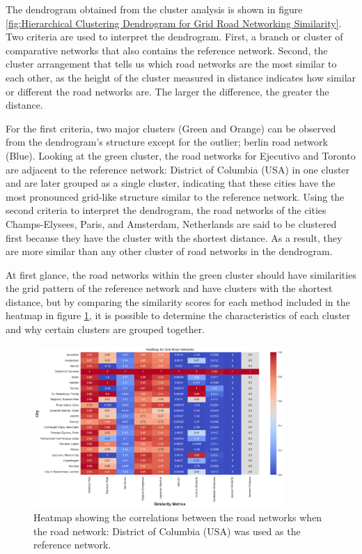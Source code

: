 The dendrogram obtained from the cluster analysis is shown in figure \ref{fig:Hierarchical Clustering Dendrogram for Grid Road Networking Similarity}. Two criteria are used to interpret the dendrogram. First, a branch or cluster of comparative networks that also contains the reference network. Second, the cluster arrangement that tells us which road networks are the most similar to each other, as the height of the cluster measured in distance indicates how similar or different the road networks are. The larger the difference, the greater the distance.

For the first criteria, two major clusters (Green and Orange) can be observed from the dendrogram's structure except for the outlier; berlin road network (Blue). Looking at the green cluster, the road networks for Ejecutivo and Toronto are adjacent to the reference network: District of Columbia (USA) in one cluster and are later grouped as a single cluster, indicating that these cities have the most pronounced grid-like structure similar to the reference network. 
Using the second criteria to interpret the dendrogram, the road networks of the cities Champs-Elysees, Paris, and Amsterdam, Netherlands are said to be clustered first because they have the cluster with the shortest distance. As a result, they are more similar than any other cluster of road networks in the dendrogram.

At first glance, the road networks within the green cluster should have similarities the grid pattern of the reference network and have clusters with the shortest distance, but by comparing the similarity scores for each method included in the heatmap in figure \ref{fig:Heatmap showing the correlations for Grid Road Networks}, it is possible to determine the characteristics of each cluster and why certain clusters are grouped together.

\begin{figure}[!ht]
\centering
\includegraphics[width=0.85\textwidth,center]{picture/Grid/gridheatmap.png}
\caption[Heatmap showing the correlations for Grid Road Networks]{Heatmap showing the correlations between the road networks when the road network: District of Columbia (USA) was used as the reference network.}
\label{fig:Heatmap showing the correlations for Grid Road Networks}
\end{figure}

